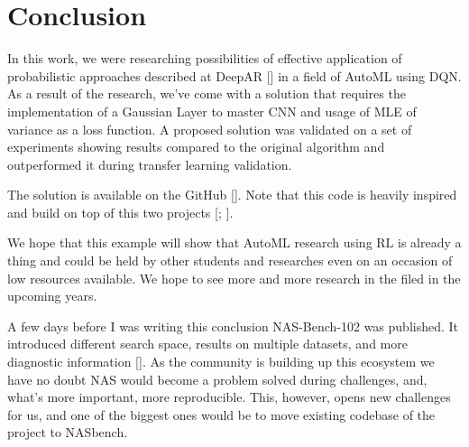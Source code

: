 \chapter{Conclusion}

In this work, we were researching possibilities of effective application of probabilistic approaches described at DeepAR [\cite{2017arXiv170404110S}] in a field of AutoML using DQN. As a result of the research, we've come with a solution that requires the implementation of a Gaussian Layer to master CNN and usage of MLE of variance as a loss function. A proposed solution was validated on a set of experiments showing results compared to the original algorithm and outperformed it during transfer learning validation.

The solution is available on the GitHub [\cite{github}]. Note that this code is heavily inspired and build on top of this two projects [\cite{nasgithub}; \cite{rltutorial}].

We hope that this example will show that AutoML research using RL is already a thing and could be held by other students and researches even on an occasion of low resources available. We hope to see more and more research in the filed in the upcoming years.

A few days before I was writing this conclusion NAS-Bench-102 was published. It introduced different search space, results on multiple datasets, and more diagnostic information [\cite{nas102}]. As the community is building up this ecosystem we have no doubt NAS would become a problem solved during challenges, and, what's more important, more reproducible. This, however, opens new challenges for us, and one of the biggest ones would be to move existing codebase of the project to NASbench.
